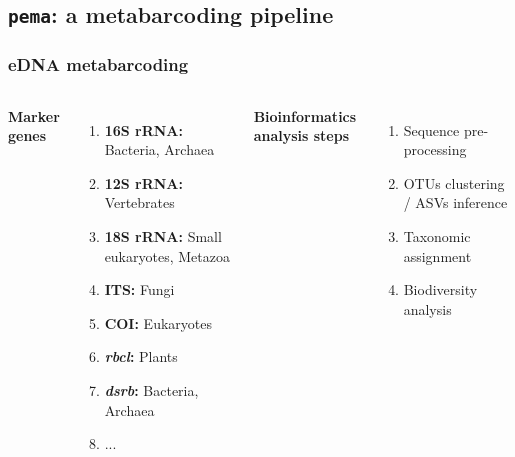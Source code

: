 \documentclass{beamer}
\begin{document}
   \begin{frame}
      \subsection{\texttt{pema}: a metabarcoding pipeline}
      \frametitle{eDNA metabarcoding}
      \begin{singlespace}


         \begin{columns}[onlytextwidth]


               \textbf{Marker genes} \\ 

               \begin{enumerate}
                  \item \textbf{16S rRNA:} Bacteria, Archaea
                  \item \textbf{12S rRNA:} Vertebrates
                  \item \textbf{18S rRNA:} Small eukaryotes, Metazoa
                  \item \textbf{ITS:} Fungi
                  \item \textbf{COI:} Eukaryotes
                  \item \textbf{\textit{rbcl}:} Plants
                  \item \textbf{\textit{dsrb}:} Bacteria, Archaea
                  \item ...
               \end{enumerate}


               \textbf{Bioinformatics analysis steps}

               \begin{enumerate}
                  \item Sequence pre-processing
                  \item OTUs clustering / ASVs inference
                  \item Taxonomic assignment
                  \item Biodiversity analysis
               \end{enumerate}
         
         \end{columns}

      \end{singlespace}
   \end{frame}
\end{document}
